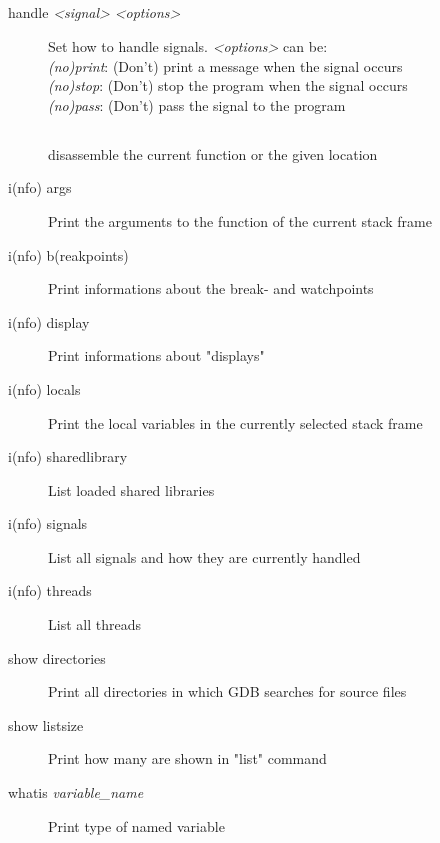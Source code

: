 \documentclass[10pt,landscape,a4paper]{article}
\newcommand{\blacksubsection}[1]{\subsection{\colorbox{black}{\makebox[\linewidth][c]{\textcolor{white}{#1}}}}}
\begin{document}
\begin{multicols}{3}
    \blacksubsection{Signals}
      \begin{description}
        \item[handle \textit{<signal>} \textit{<options>}]
              \parbox{8cm}{ \vspace{0.1cm}Set how to handle signals. \textit{<options>} can be: \\
                                       \textit{(no)print}: (Don't) print a message when the signal occurs\\
                                       \textit{(no)stop}: (Don't) stop the program when the signal occurs\\
                                       \textit{(no)pass}: (Don't) pass the signal to the program}
      \end{description}

    \blacksubsection{Informations}
      \begin{description}
        \item[\parbox{6cm}{ \vspace{0.1cm} disassemble \\ disassemble \textit{<where>} \vspace{0.1cm}}]
              disassemble the current function or the given location
        \item[i(nfo) args] Print the arguments to the function of the current stack frame
        \item[i(nfo) b(reakpoints)] Print informations about the break- and watchpoints
        \item[i(nfo) display] Print informations about "displays"
        \item[i(nfo) locals] Print the local variables in the currently selected stack frame
        \item[i(nfo) sharedlibrary] List loaded shared libraries
        \item[i(nfo) signals] List all signals and how they are currently handled
        \item[i(nfo) threads] List all threads
        \item[show directories] Print all directories in which GDB searches for source files
        \item[show listsize] Print how many are shown in "list" command
        \item[whatis \textit{variable\_name}] Print type of named variable
      \end{description}

  \end{multicols}
\end{document}
